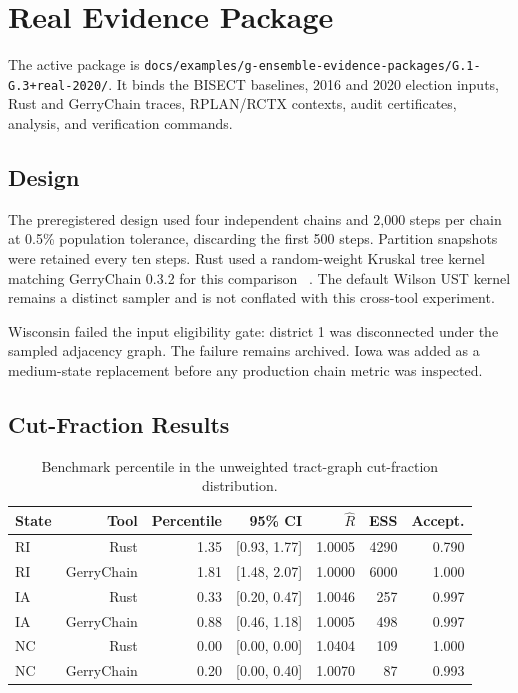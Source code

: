 \section{Real Evidence Package}

The active package is
\texttt{docs/examples/g-ensemble-evidence-packages/G.1-G.3+real-2020/}.
It binds the BISECT baselines, 2016 and 2020 election inputs, Rust and
GerryChain traces, RPLAN/RCTX contexts, audit certificates, analysis, and
verification commands.

\subsection{Design}

The preregistered design used four independent chains and 2,000 steps per chain
at 0.5\% population tolerance, discarding the first 500 steps. Partition
snapshots were retained every ten steps. Rust used a random-weight Kruskal tree
kernel matching GerryChain 0.3.2 for this comparison
~\citep{deford2021recombination,gerrychain2021}. The default Wilson UST
kernel remains a distinct sampler and is not conflated with this cross-tool
experiment.

Wisconsin failed the input eligibility gate: district 1 was disconnected under
the sampled adjacency graph. The failure remains archived. Iowa was added as a
medium-state replacement before any production chain metric was inspected.

\subsection{Cut-Fraction Results}

\begin{table}[h]
\centering
\caption{Benchmark percentile in the unweighted tract-graph cut-fraction distribution.}
\begin{tabular}{lrrrrrr}
\toprule
State & Tool & Percentile & 95\% CI & $\widehat R$ & ESS & Accept. \\
\midrule
RI & Rust & 1.35 & [0.93, 1.77] & 1.0005 & 4290 & 0.790 \\
RI & GerryChain & 1.81 & [1.48, 2.07] & 1.0000 & 6000 & 1.000 \\
IA & Rust & 0.33 & [0.20, 0.47] & 1.0046 & 257 & 0.997 \\
IA & GerryChain & 0.88 & [0.46, 1.18] & 1.0005 & 498 & 0.997 \\
NC & Rust & 0.00 & [0.00, 0.00] & 1.0404 & 109 & 1.000 \\
NC & GerryChain & 0.20 & [0.00, 0.40] & 1.0070 & 87 & 0.993 \\
\bottomrule
\end{tabular}
\end{table}

